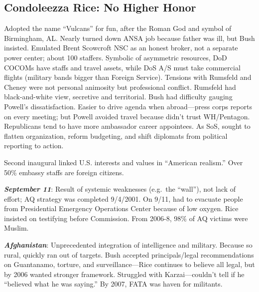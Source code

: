 \documentclass[
]{article}
\begin{document}
\hypertarget{condoleezza-rice-no-higher-honor}{%
\subsection{Condoleezza Rice: No Higher
Honor}\label{condoleezza-rice-no-higher-honor}}

Adopted the name ``Vulcans'' for fun, after the Roman God and symbol of
Birmingham, AL. Nearly turned down ANSA job because father was ill, but
Bush insisted. Emulated Brent Scowcroft NSC as an honest broker, not a
separate power center; about 100 staffers. Symbolic of asymmetric
resources, DoD COCOMs have staffs and travel assets, while DoS A/S must
take commercial flights (military bands bigger than Foreign Service).
Tensions with Rumsfeld and Cheney were not personal animosity but
professional conflict. Rumsfeld had black-and-white view, secretive and
territorial. Bush had difficulty gauging Powell's dissatisfaction.
Easier to drive agenda when abroad---press corps reports on every
meeting; but Powell avoided travel because didn't trust WH/Pentagon.
Republicans tend to have more ambassador career appointees. As SoS,
sought to flatten organization, reform budgeting, and shift diplomats
from political reporting to action.

Second inaugural linked U.S. interests and values in ``American
realism.'' Over 50\% embassy staffs are foreign citizens.

\textbf{\emph{September 11}}: Result of systemic weaknesses (e.g.~the
``wall''), not lack of effort; AQ strategy was completed 9/4/2001. On
9/11, had to evacuate people from Presidential Emergency Operations
Center because of low oxygen. Rice insisted on testifying before
Commission. From 2006-8, 98\% of AQ victims were Muslim.

\textbf{\emph{Afghanistan}}: Unprecedented integration of intelligence
and military. Because so rural, quickly ran out of targets. Bush
accepted principals/legal recommendations on Guantanamo, torture, and
surveillance---Rice continues to believe all legal, but by 2006 wanted
stronger framework. Struggled with Karzai---couldn't tell if he
``believed what he was saying.'' By 2007, FATA was haven for militants.
\end{document}
